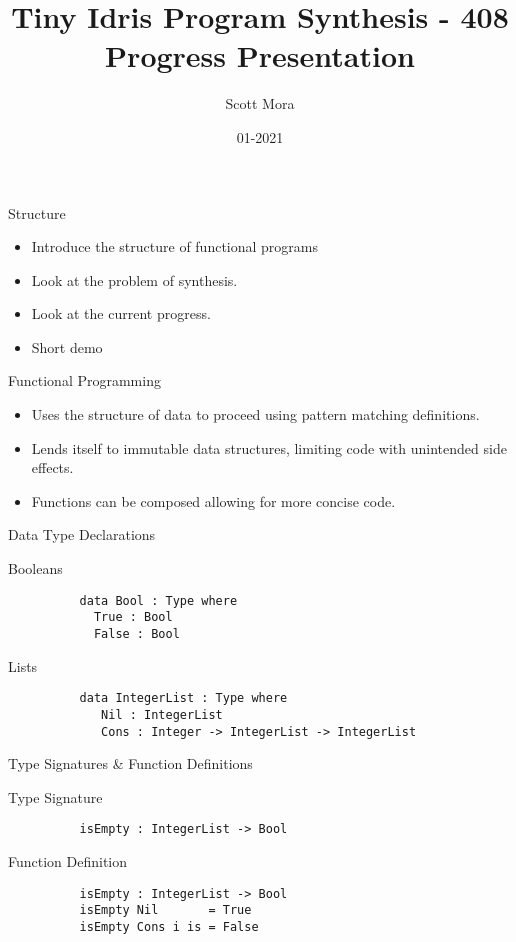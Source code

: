 \documentclass[presentation]{beamer}
\author{Scott Mora}
\date{01-2021}
\title{Tiny Idris Program Synthesis - 408 Progress Presentation}
\begin{document}
\maketitle

\begin{frame}[fragile]{Structure}
  \begin{itemize}
  \item {Introduce the structure of functional programs}
  \item {Look at the problem of synthesis.}
  \item {Look at the current progress.}
  \item {Short demo}
  \end{itemize}
\end{frame}

\begin{frame}[fragile]{Functional Programming}
  \begin{itemize}
  \item {Uses the structure of data to proceed using
    pattern matching definitions.}
  \item {Lends itself to immutable data structures, limiting
    code with unintended side effects.}
  \item {Functions can be composed allowing for more
    concise code.}
  \end{itemize}
\end{frame}

\begin{frame}[fragile]{Data Type Declarations}
      \begin{block}{Booleans}
        \begin{verbatim}
          data Bool : Type where
            True : Bool
            False : Bool
        \end{verbatim}
      \end{block}
    
      \begin{block}{Lists}
        \begin{verbatim}
          data IntegerList : Type where
             Nil : IntegerList 
             Cons : Integer -> IntegerList -> IntegerList
        \end{verbatim}
      \end{block}
\end{frame}

\begin{frame}[fragile]{Type Signatures \& Function Definitions}
      \begin{block}{Type Signature}
        \begin{verbatim}
          isEmpty : IntegerList -> Bool
        \end{verbatim}
      \end{block}
      \begin{block}{Function Definition}
        \begin{verbatim}
          isEmpty : IntegerList -> Bool
          isEmpty Nil       = True
          isEmpty Cons i is = False
        \end{verbatim}
      \end{block}
\end{frame}
\end{document}
